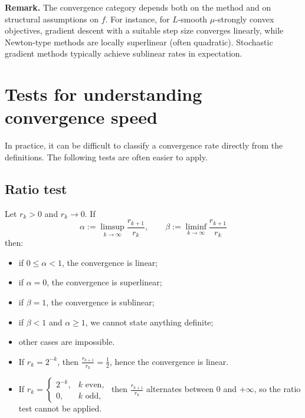 \noindent \textbf{Remark.} The convergence category depends both on the method
and on structural assumptions on $f$. For instance, for $L$-smooth
$\mu$-strongly convex objectives, gradient descent with a suitable step size
converges linearly, while Newton-type methods are locally superlinear (often
quadratic). Stochastic gradient methods typically achieve sublinear rates in
expectation.

\section{Tests for understanding convergence speed}
In practice, it can be difficult to classify a convergence rate directly from the definitions.
The following  tests are often easier to apply.
\subsection{Ratio test}
\label{sec:ratio-test}
\begin{theorem}
Let $r_k>0$ and $r_k\to 0$. If 
\[
  \alpha := \limsup_{k\to\infty}\frac{r_{k+1}}{r_k},\qquad \beta := \liminf_{k \to \infty } \frac{r_{k+1 }}{r_k} 
\]
then:
\begin{itemize}
  \item if $0\le\alpha<1$, the convergence is linear;
  \item if $\alpha=0$, the convergence is superlinear;
  \item if $\beta=1$, the convergence is sublinear;
  \item if $\beta < 1$ and $\alpha \ge 1$, we cannot state anything definite;
  \item other cases are impossible.
\end{itemize}
\end{theorem}

\begin{example}
\leavevmode
\begin{itemize}
  \item If $r_k=2^{-k}$, then $\frac{r_{k+1}}{r_k}=\tfrac12$, hence the
  convergence is linear.
  \item If
  $
    r_k=
    \begin{cases}
      2^{-k}, & k \text{ even},\\
      0, & k \text{ odd},
    \end{cases}
  $
  then $\frac{r_{k+1}}{r_k}$ alternates between $0$ and $+\infty$, so the ratio
  test cannot be applied.
\end{itemize}
\end{example}

